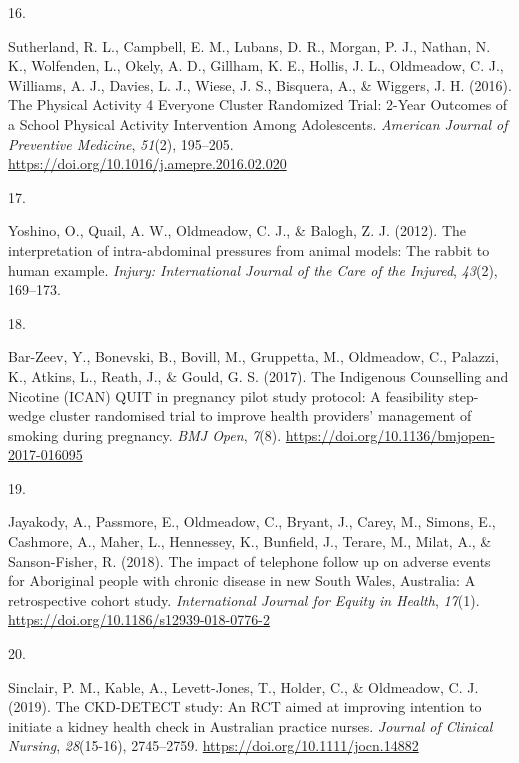 \documentclass[11pt, a4paper]{awesome-cv}
\newlength{\csllabelwidth}
\newcommand{\CSLLeftMargin}[1]{\parbox[t]{\csllabelwidth}{#1}}
\newcommand{\CSLRightInline}[1]{\parbox[t]{\linewidth - \csllabelwidth}{#1}}
\begin{document}
\leavevmode\hypertarget{ref-sutherland_physical_2016}{}%
\CSLLeftMargin{16. }
\CSLRightInline{Sutherland, R. L., Campbell, E. M., Lubans, D. R.,
Morgan, P. J., Nathan, N. K., Wolfenden, L., Okely, A. D., Gillham, K.
E., Hollis, J. L., Oldmeadow, C. J., Williams, A. J., Davies, L. J.,
Wiese, J. S., Bisquera, A., \& Wiggers, J. H. (2016). The Physical
Activity 4 Everyone Cluster Randomized Trial: 2-Year Outcomes of a
School Physical Activity Intervention Among Adolescents. \emph{American
Journal of Preventive Medicine}, \emph{51}(2), 195--205.
\url{https://doi.org/10.1016/j.amepre.2016.02.020}}

\leavevmode\hypertarget{ref-yoshino_interpretation_2012}{}%
\CSLLeftMargin{17. }
\CSLRightInline{Yoshino, O., Quail, A. W., Oldmeadow, C. J., \& Balogh,
Z. J. (2012). The interpretation of intra-abdominal pressures from
animal models: The rabbit to human example. \emph{Injury: International
Journal of the Care of the Injured}, \emph{43}(2), 169--173.}

\leavevmode\hypertarget{ref-bar-zeev_indigenous_2017}{}%
\CSLLeftMargin{18. }
\CSLRightInline{Bar-Zeev, Y., Bonevski, B., Bovill, M., Gruppetta, M.,
Oldmeadow, C., Palazzi, K., Atkins, L., Reath, J., \& Gould, G. S.
(2017). The Indigenous Counselling and Nicotine (ICAN) QUIT in pregnancy
pilot study protocol: A feasibility step-wedge cluster randomised trial
to improve health providers' management of smoking during pregnancy.
\emph{BMJ Open}, \emph{7}(8).
\url{https://doi.org/10.1136/bmjopen-2017-016095}}

\leavevmode\hypertarget{ref-jayakody_impact_2018}{}%
\CSLLeftMargin{19. }
\CSLRightInline{Jayakody, A., Passmore, E., Oldmeadow, C., Bryant, J.,
Carey, M., Simons, E., Cashmore, A., Maher, L., Hennessey, K., Bunfield,
J., Terare, M., Milat, A., \& Sanson-Fisher, R. (2018). The impact of
telephone follow up on adverse events for Aboriginal people with chronic
disease in new South Wales, Australia: A retrospective cohort study.
\emph{International Journal for Equity in Health}, \emph{17}(1).
\url{https://doi.org/10.1186/s12939-018-0776-2}}

\leavevmode\hypertarget{ref-sinclair_ckd-detect_2019}{}%
\CSLLeftMargin{20. }
\CSLRightInline{Sinclair, P. M., Kable, A., Levett-Jones, T., Holder,
C., \& Oldmeadow, C. J. (2019). The CKD-DETECT study: An RCT aimed at
improving intention to initiate a kidney health check in Australian
practice nurses. \emph{Journal of Clinical Nursing}, \emph{28}(15-16),
2745--2759. \url{https://doi.org/10.1111/jocn.14882}}
\end{document}
